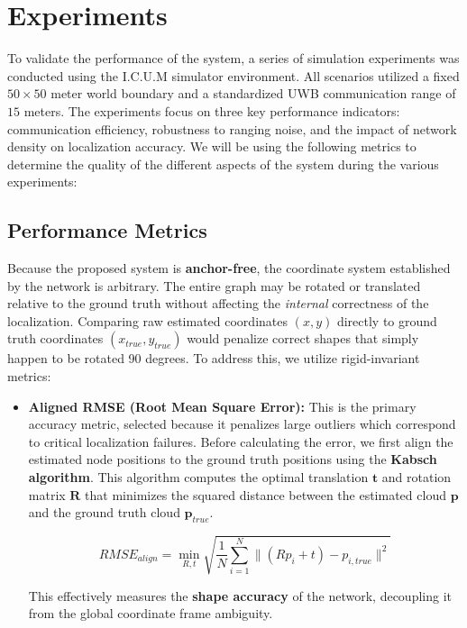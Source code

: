 \section{Experiments}
\noindent To validate the performance of the system, a series of simulation experiments was conducted using the I.C.U.M simulator environment. All scenarios utilized a fixed $50 \times 50$ meter world boundary and a standardized UWB communication range of $15$ meters. The experiments focus on three key performance indicators: communication efficiency, robustness to ranging noise, and the impact of network density on localization accuracy. We will be using the following metrics to determine the quality of the different aspects of the system during the various experiments:

\subsection{Performance Metrics}
\noindent Because the proposed system is \textbf{anchor-free}, the coordinate system established by the network is arbitrary. The entire graph may be rotated or translated relative to the ground truth without affecting the \textit{internal} correctness of the localization. Comparing raw estimated coordinates $(x, y)$ directly to ground truth coordinates $(x_{true}, y_{true})$ would penalize correct shapes that simply happen to be rotated 90 degrees. To address this, we utilize rigid-invariant metrics:

\begin{itemize}
    \item \textbf{Aligned RMSE (Root Mean Square Error):} 
    This is the primary accuracy metric, selected because it penalizes large outliers which correspond to critical localization failures. Before calculating the error, we first align the estimated node positions to the ground truth positions using the \textbf{Kabsch algorithm}. This algorithm computes the optimal translation $\mathbf{t}$ and rotation matrix $\mathbf{R}$ that minimizes the squared distance between the estimated cloud $\mathbf{p}$ and the ground truth cloud $\mathbf{p}_{true}$.
    
    \begin{equation}
        RMSE_{align} = \min_{R, t} \sqrt{\frac{1}{N} \sum_{i=1}^{N} \| (R p_i + t) - p_{i,true} \|^2}
    \end{equation}
    
    This effectively measures the \textbf{shape accuracy} of the network, decoupling it from the global coordinate frame ambiguity.
\end{itemize}

